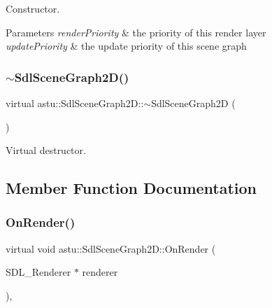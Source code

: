 Constructor.


\begin{DoxyParams}{Parameters}
{\em render\+Priority} & the priority of this render layer \\
\hline
{\em update\+Priority} & the update priority of this scene graph \\
\hline
\end{DoxyParams}
\mbox{\label{classastu_1_1SdlSceneGraph2D_af9eba7a73ba3e59f567cd43052ec78be}} 
\subsubsection{\texorpdfstring{$\sim$\+Sdl\+Scene\+Graph2\+D()}{~SdlSceneGraph2D()}}
{\footnotesize\ttfamily virtual astu\+::\+Sdl\+Scene\+Graph2\+D\+::$\sim$\+Sdl\+Scene\+Graph2D (\begin{DoxyParamCaption}{ }\end{DoxyParamCaption})\hspace{0.3cm}{\ttfamily [virtual]}}

Virtual destructor. 

\subsection{Member Function Documentation}
\mbox{\label{classastu_1_1SdlSceneGraph2D_a2af5a74277e6478da29ba88d0f11daea}} 
\subsubsection{\texorpdfstring{On\+Render()}{OnRender()}}
{\footnotesize\ttfamily virtual void astu\+::\+Sdl\+Scene\+Graph2\+D\+::\+On\+Render (\begin{DoxyParamCaption}\item[{S\+D\+L\+\_\+\+Renderer $\ast$}]{renderer }\end{DoxyParamCaption})\hspace{0.3cm}{\ttfamily [override]}, {\ttfamily [virtual]}}

